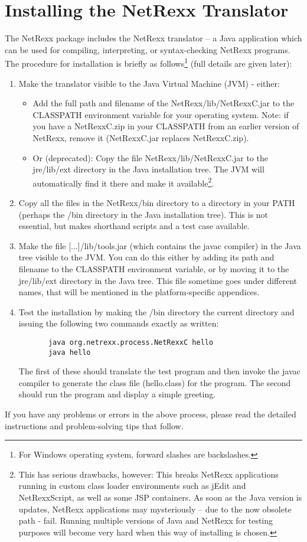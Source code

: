 \section{Installing the NetRexx Translator}
The NetRexx package includes the NetRexx translator – a Java application which can be used for compiling, interpreting, or syntax-checking NetRexx programs. The procedure for installation is briefly as follows\footnote{For Windows operating system, forward slashes are backslashes.} (full details are given later):
\begin{enumerate}
\item Make the translator visible to the Java Virtual Machine (JVM) - either:
\begin{itemize} 
\item Add the full path and filename of the NetRexx/lib/NetRexxC.jar to the CLASSPATH environment variable for your operating system. 
Note: if you have a NetRexxC.zip in your CLASSPATH from an earlier version of NetRexx, remove it (NetRexxC.jar replaces NetRexxC.zip).
\item Or (deprecated): Copy the file NetRexx/lib/NetRexxC.jar to the jre/lib/ext directory in the Java installation tree. The JVM will automatically find it there and make it available\footnote{ This has serious drawbacks, however:
This breaks NetRexx applications running in custom class loader environments such as jEdit and NetRexxScript, as well as some JSP containers.
As soon as the Java version is updates, NetRexx applications may mysteriously – due to the now obsolete path - fail.
Running multiple versions of Java and NetRexx for testing purposes will become very hard when this way of installing is chosen.}.
\end{itemize}
\item Copy all the files in the NetRexx/bin directory to a directory in your PATH (perhaps the /bin directory in the Java installation tree). This is not essential, but makes shorthand scripts and a test case available. 
\item Make the file [...]/lib/tools.jar (which contains the javac compiler) in the Java tree visible to the JVM. You can do this either by adding its path and filename to the CLASSPATH environment variable, or by moving it to the jre/lib/ext directory in the Java tree. This file sometime goes under different names, that will be mentioned in the platform-specific appendices.
\item Test the installation by making the /bin directory the current directory and issuing the following two commands exactly as written: 
\begin{verbatim}
       java org.netrexx.process.NetRexxC hello
       java hello
\end{verbatim}
The first of these should translate the test program and then invoke the javac compiler to generate the class file (hello.class) for the program. The second should run the program and
display a simple greeting.
\end{enumerate}
If you have any problems or errors in the above process, please read the detailed instructions and problem-solving tips that follow. 

